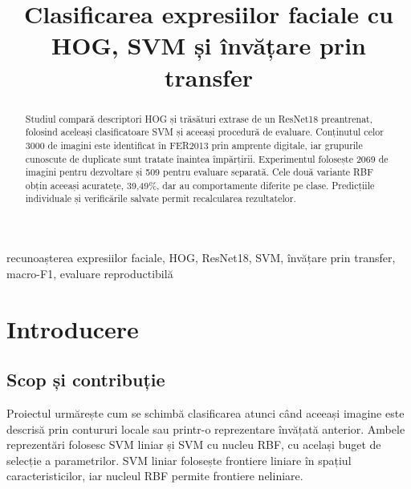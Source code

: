\documentclass[conference]{IEEEtran}
\begin{document}
\renewcommand{\tablename}{Tabelul}
\renewcommand{\refname}{Bibliografie}
\renewcommand{\abstractname}{Rezumat}
\renewcommand{\IEEEkeywordsname}{Cuvinte cheie}

\title{Clasificarea expresiilor faciale cu HOG, SVM și învățare prin transfer}

\author{
}

\maketitle

\begin{abstract}
Studiul compară descriptori HOG și trăsături extrase de un ResNet18 preantrenat, folosind aceleași clasificatoare SVM și aceeași procedură de evaluare. Conținutul celor 3000 de imagini este identificat în FER2013 prin amprente digitale, iar grupurile cunoscute de duplicate sunt tratate înaintea împărțirii. Experimentul folosește 2069 de imagini pentru dezvoltare și 509 pentru evaluare separată. Cele două variante RBF obțin aceeași acuratețe, 39,49\%, dar au comportamente diferite pe clase. Predicțiile individuale și verificările salvate permit recalcularea rezultatelor.
\end{abstract}

\begin{IEEEkeywords}
recunoașterea expresiilor faciale, HOG, ResNet18, SVM, învățare prin transfer, macro-F1, evaluare reproductibilă
\end{IEEEkeywords}

\section{Introducere}
\subsection{Scop și contribuție}
Proiectul urmărește cum se schimbă clasificarea atunci când aceeași imagine este descrisă prin contururi locale sau printr-o reprezentare învățată anterior. Ambele reprezentări folosesc SVM liniar și SVM cu nucleu RBF, cu același buget de selecție a parametrilor. SVM liniar folosește frontiere liniare în spațiul caracteristicilor, iar nucleul RBF permite frontiere neliniare.
\end{document}
